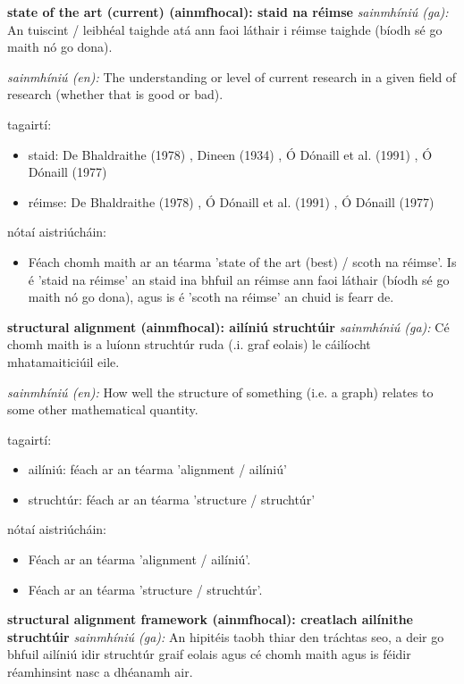 \documentclass{article}
\begin{document}
\textbf{state of the art (current) (ainmfhocal): staid na réimse}
\textit{sainmhíniú (ga):} An tuiscint / leibhéal taighde atá ann faoi láthair i réimse taighde (bíodh sé go maith nó go dona).

\textit{sainmhíniú (en):} The understanding or level of current research in a given field of research (whether that is good or bad).

tagairtí:
\begin{itemize}
	\item staid: De Bhaldraithe (1978) \cite{de-bhaldraithe}, Dineen (1934) \cite{dineen}, Ó Dónaill et al. (1991) \cite{focloir-beag}, Ó Dónaill (1977) \cite{odonaill}
	\item réimse: De Bhaldraithe (1978) \cite{de-bhaldraithe}, Ó Dónaill et al. (1991) \cite{focloir-beag}, Ó Dónaill (1977) \cite{odonaill}
\end{itemize}

nótaí aistriúcháin:
\begin{itemize}
	\item Féach chomh maith ar an téarma 'state of the art (best) / scoth na réimse'. Is é 'staid na réimse' an staid ina bhfuil an réimse ann faoi láthair (bíodh sé go maith nó go dona), agus is é 'scoth na réimse' an chuid is fearr de.
\end{itemize}


\textbf{structural alignment (ainmfhocal): ailíniú struchtúir}
\textit{sainmhíniú (ga):} Cé chomh maith is a luíonn struchtúr ruda (.i. graf eolais) le cáilíocht mhatamaiticiúil eile.

\textit{sainmhíniú (en):} How well the structure of something (i.e. a graph) relates to some other mathematical quantity.

tagairtí:
\begin{itemize}
	\item ailíniú: féach ar an téarma 'alignment / ailíniú'
	\item struchtúr: féach ar an téarma 'structure / struchtúr'
\end{itemize}

nótaí aistriúcháin:
\begin{itemize}
	\item Féach ar an téarma 'alignment / ailíniú'.
	\item Féach ar an téarma 'structure / struchtúr'.
\end{itemize}


\textbf{structural alignment framework (ainmfhocal): creatlach ailínithe struchtúir}
\textit{sainmhíniú (ga):} An hipitéis taobh thiar den tráchtas seo, a deir go bhfuil ailíniú idir struchtúr graif eolais agus cé chomh maith agus is féidir réamhinsint nasc a dhéanamh air.
\end{document}
